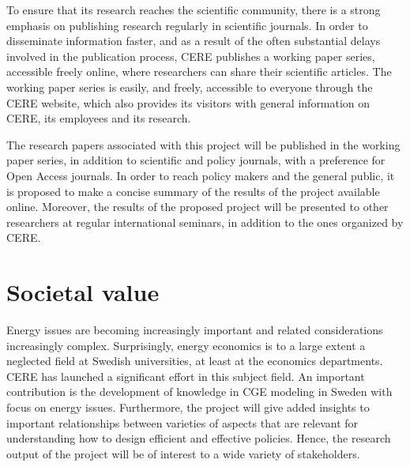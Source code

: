 To ensure that its research reaches the scientific community, there is a strong emphasis on publishing research regularly in scientific journals. In order to disseminate information faster, and as a result of the often substantial delays involved in the publication process, CERE publishes a working paper series, accessible freely online, where researchers can share their scientific articles. The working paper series is easily, and freely, accessible to everyone through the CERE website, which also provides its visitors with general information on CERE, its employees and its research.

The research papers associated with this project will be published in the working paper series, in addition to scientific and policy journals, with a preference for Open Access journals. In order to reach policy makers and the general public, it is proposed to make a concise summary of the results of the project available online. Moreover, the results of the proposed project will be presented to other researchers at regular international seminars, in addition to the ones organized by CERE.

\section{Societal value}
Energy issues are becoming increasingly important and related considerations increasingly complex. Surprisingly, energy economics is to a large extent a neglected field at Swedish universities, at least at the economics departments. CERE has launched a significant effort in this subject field. An important contribution is the development of knowledge in CGE modeling in Sweden with focus on energy issues. Furthermore, the project will give added insights to important relationships between varieties of aspects that are relevant for understanding how to design efficient and effective policies. Hence, the research output of the project will be of interest to a wide variety of stakeholders.


